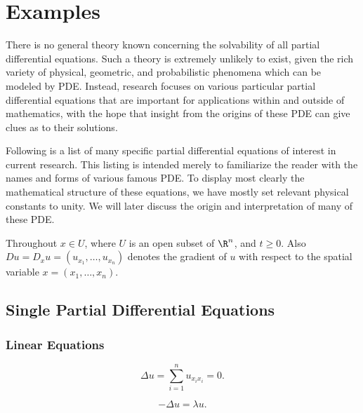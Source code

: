 \section{Examples}
\label{sec:pde-examples}

There is no general theory known concerning the solvability of all partial differential equations. Such a theory is extremely unlikely to exist, given the rich variety of physical, geometric, and probabilistic phenomena which can be modeled by PDE. Instead, research focuses on various particular partial differential equations that are important for applications within and outside of mathematics, with the hope that insight from the origins of these PDE can give clues as to their solutions.

Following is a list of many specific partial differential equations of interest in current research. This listing is intended merely to familiarize the reader with the names and forms of various famous PDE. To display most clearly the mathematical structure of these equations, we have mostly set relevant physical constants to unity. We will later discuss the origin and interpretation of many of these PDE.

Throughout $x \in U$, where $U$ is an open subset of $\R^n$, and $t \geq 0$. Also $Du = D_x u = (u_{x_1}, \ldots, u_{x_n})$ denotes the gradient of $u$ with respect to the spatial variable $x = (x_1, \ldots, x_n)$.

\subsection{Single Partial Differential Equations}
\label{sec:single-pdes}

\subsubsection{Linear Equations}
\label{sec:examples-linear-equations}

\begin{example}
\label{ex:laplaces-equation}
\leanok
$$\Delta u = \sum_{i=1}^n u_{x_i x_i} = 0.$$
\end{example}

\begin{example}
\label{ex:helmholtz-eigenvalue-equation}
\leanok
$$-\Delta u = \lambda u.$$
\end{example}

